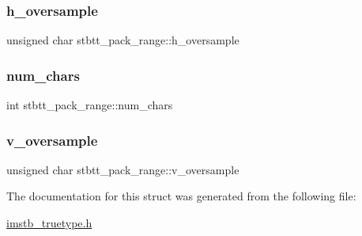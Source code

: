 \subsubsection{\texorpdfstring{h\+\_\+oversample}{h\_oversample}}
{\footnotesize\ttfamily unsigned char stbtt\+\_\+pack\+\_\+range\+::h\+\_\+oversample}

\mbox{\label{structstbtt__pack__range_a046d65b6ffb65fb998d471ba098e2e23}} 
\subsubsection{\texorpdfstring{num\+\_\+chars}{num\_chars}}
{\footnotesize\ttfamily int stbtt\+\_\+pack\+\_\+range\+::num\+\_\+chars}

\mbox{\label{structstbtt__pack__range_a6288f14006e257544db3d015c32b4113}} 
\subsubsection{\texorpdfstring{v\+\_\+oversample}{v\_oversample}}
{\footnotesize\ttfamily unsigned char stbtt\+\_\+pack\+\_\+range\+::v\+\_\+oversample}



The documentation for this struct was generated from the following file\+:\begin{DoxyCompactItemize}
\item 
\mbox{\hyperlink{imstb__truetype_8h}{imstb\+\_\+truetype.\+h}}\end{DoxyCompactItemize}
